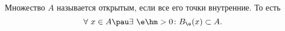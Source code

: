 
    Множество $A$ называется открытым, если все его точки внутренние. То есть
    \[  \forall\  x\in A\pau\exists\  \e\hm>0\colon B_\e(x)\subset A.    \]
